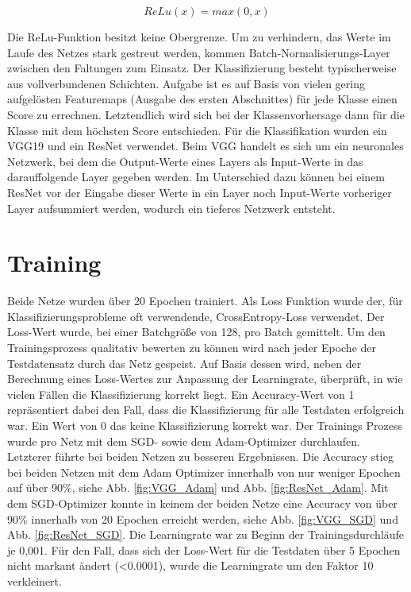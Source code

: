 \documentclass[sigconf]{acmart}
\begin{document}
\begin{equation}\label{ReLu}
ReLu(x) = max(0,x)
\end{equation}


\noindent Die ReLu-Funktion besitzt keine Obergrenze. Um zu verhindern, das Werte im Laufe des Netzes stark gestreut werden, kommen Batch-Normalisierungs-Layer \cite{ioffe2015batch} zwischen den Faltungen zum Einsatz. 
Der Klassifizierung besteht typischerweise aus vollverbundenen Schichten. Aufgabe ist es auf Basis von vielen gering aufgelösten Featuremaps (Ausgabe des ersten Abschnittes) für jede Klasse einen Score zu errechnen. Letztendlich wird sich bei der Klassenvorhersage dann für die Klasse mit dem höchsten Score entschieden. 
Für die Klassifikation wurden ein VGG19 und ein ResNet verwendet. Beim VGG handelt es sich um ein neuronales Netzwerk, bei dem die Output-Werte eines Layers als Input-Werte in das darauffolgende Layer gegeben werden. Im Unterschied dazu können bei einem ResNet vor der Eingabe dieser Werte in ein Layer noch Input-Werte vorheriger Layer aufsummiert werden, wodurch ein tieferes Netzwerk entsteht. 

\section{Training}
\label{section:training}
Beide Netze wurden über 20 Epochen trainiert. Als Loss Funktion wurde der, für Klassifizierungsprobleme oft verwendende, CrossEntropy-Loss verwendet. Der Loss-Wert wurde, bei einer Batchgröße von 128, pro Batch gemittelt.  
Um den Trainingsprozess qualitativ bewerten zu können wird nach jeder Epoche der Testdatensatz durch das Netz gespeist. Auf Basis dessen wird, neben der Berechnung eines Loss-Wertes zur Anpassung der Learningrate, überprüft, in wie vielen Fällen die Klassifizierung korrekt liegt.  Ein Accuracy-Wert von 1 repräsentiert dabei den Fall, dass die Klassifizierung für alle Testdaten erfolgreich war. Ein Wert von 0 das keine Klassifizierung korrekt war. 
Der Trainings Prozess wurde pro Netz mit dem SGD- sowie dem Adam-Optimizer durchlaufen. Letzterer führte bei beiden Netzen zu besseren Ergebnissen. Die Accuracy stieg bei beiden Netzen mit dem Adam Optimizer innerhalb von nur weniger Epochen auf über 90\%, siehe Abb. \ref{fig:VGG_Adam} und Abb. \ref{fig:ResNet_Adam}. Mit dem SGD-Optimizer konnte in keinem der beiden Netze eine Accuracy von über 90\% innerhalb von 20 Epochen erreicht werden, siehe Abb. \ref{fig:VGG_SGD} und Abb. \ref{fig:ResNet_SGD}.
\newline
\newline
Die Learningrate war zu Beginn der Trainingsdurchläufe je 0,001. Für den Fall, dass sich der Loss-Wert für die Testdaten über 5 Epochen nicht markant ändert (<0.0001), wurde die Learningrate um den Faktor 10 verkleinert. 
\end{document}

